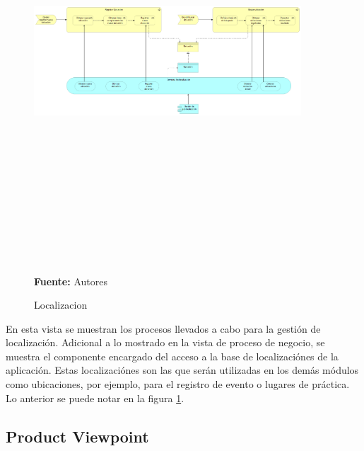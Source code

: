\begin{figure}[!htb]
  \begin{center}
    \includegraphics[angle=90,width=10cm,height=15cm]{./imagenes/Archimate/vistas/application_usage/localizacion.png}
    \caption{Localizacion}
    \label{fig:BP_localizacion}
    \textbf{Fuente:}  Autores \\
  \end{center}
\end{figure}

En esta vista se muestran los procesos llevados a cabo para la gestión de localización. Adicional a lo mostrado en la vista de proceso de negocio, se muestra el componente encargado del acceso a la base de localizaciónes de la aplicación. Estas localizaciónes son las que serán utilizadas en los demás módulos como ubicaciones, por ejemplo, para el registro de evento o lugares de práctica. Lo anterior se puede notar en la figura \ref{fig:BP_localizacion}.

\subsection{Product Viewpoint}

